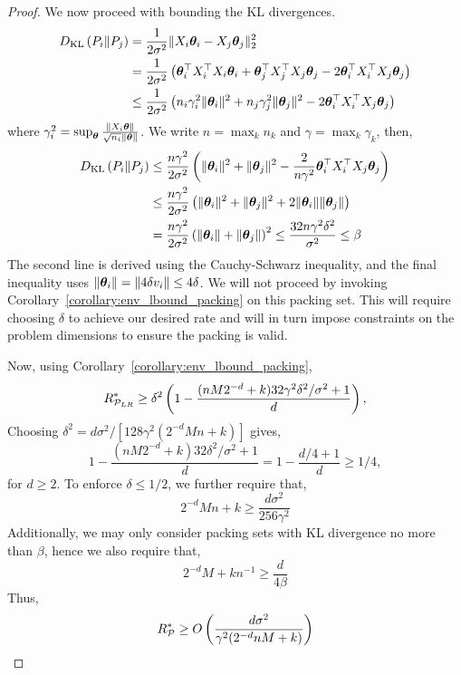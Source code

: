 \begin{proof}
We now proceed with bounding the KL divergences.
\begin{align*}
    D_{\mathrm{KL}}\left(P_i\Vert P_j\right) &= \frac{1}{2\sigma^2}\Vert X_i\bm{\theta}_i - X_j\bm{\theta}_j\Vert_2^2\\
    &= \frac{1}{2\sigma^2}\left(\bm{\theta}_i^\top X_i^\top X_i \bm{\theta}_i + \bm{\theta}_j^\top X_j^\top X_j \bm{\theta}_j - 2\bm{\theta}_i^\top X_i^\top X_j \bm{\theta}_j \right)\\
    &\leq \frac{1}{2\sigma^2}\left(n_i \gamma_i^2 \Vert \bm{\theta}_i \Vert^2 + n_j \gamma_j^2 \Vert \bm{\theta}_j \Vert^2 - 2\bm{\theta}_i^\top X_i^\top X_j \bm{\theta}_j \right)
\end{align*}
where $\gamma_i^2 = \sup_{\bm{\theta}} \frac{\Vert X_i \bm{\theta} \Vert}{\sqrt{n_i}\Vert \bm{\theta} \Vert}$. We write $n = \max_k{n_k}$ and $\gamma = \max_{k}{\gamma_k}$, then,
\begin{align*}
    D_{\mathrm{KL}}\left(P_i\Vert P_j\right) &\leq \frac{n \gamma^2}{2\sigma^2}\left(\Vert \bm{\theta}_i \Vert^2 + \Vert \bm{\theta}_j \Vert^2 - \frac{2}{n\gamma^2}\bm{\theta}_i^\top X_i^\top X_j \bm{\theta}_j \right)\\
    &\leq \frac{n \gamma^2}{2\sigma^2}\left(\Vert \bm{\theta}_i \Vert^2 + \Vert \bm{\theta}_j \Vert^2 + 2\Vert\bm{\theta}_i\Vert \Vert\bm{\theta}_j\Vert \right)\\
    &= \frac{n \gamma^2}{2\sigma^2}\left( \Vert\bm{\theta}_i\Vert + \Vert\bm{\theta}_j\Vert\right)^2 \leq \frac{32 n \gamma^2 \delta^2}{\sigma^2} \leq \beta
\end{align*}
The second line is derived using the Cauchy-Schwarz inequality, and the final inequality uses $\Vert \bm{\theta}_i \Vert = \Vert 4\delta v_i \Vert \leq 4\delta$. We will not proceed by invoking Corollary~\ref{corollary:env_lbound_packing} on this packing set. This will require choosing $\delta$ to achieve our desired rate and will in turn impose constraints on the problem dimensions to ensure the packing is valid.

Now, using Corollary~\ref{corollary:env_lbound_packing},
\[R^*_{\mathcal{P}_{LR}} \geq \delta^2\left(1 - \frac{(nM 2^{-d} + k)32\gamma^2\delta^2 / \sigma^2 + 1}{d}\right),\]
Choosing $\delta^2 = d\sigma^2 / \left[128\gamma^2 (2^{-d} Mn + k)\right]$ gives,
\[1 - \frac{(nM 2^{-d} + k)32\delta^2 / \sigma^2 + 1}{d} = 1 - \frac{d/4 + 1}{d} \geq 1/4,\]
for $d \geq 2$. To enforce $\delta \leq 1/2$, we further require that,
\[2^{-d}Mn + k \geq \frac{d\sigma^2}{256\gamma^2}\]
Additionally, we may only consider packing sets with KL divergence no more than $\beta$, hence we also require that,
\[2^{-d}M + kn^{-1} \geq \frac{d}{4\beta}\]
Thus,
\[R^*_{\mathcal{P}} \geq O\left(\frac{d\sigma^2}{\gamma^2 (2^{-d}nM + k)}\right)\]
\end{proof}